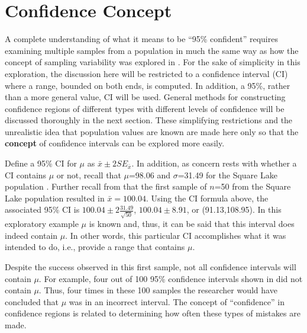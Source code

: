 \documentclass[10pt,openany]{book}\usepackage[]{graphicx}\usepackage[]{color}
\begin{document}
\section{Confidence Concept} \label{sect:CIconcept}
A complete understanding of what it means to be ``95\% confident'' requires examining multiple samples from a population in much the same way as how the concept of sampling variability was explored in .  For the sake of simplicity in this exploration, the discussion here will be restricted to a confidence interval (CI) where a range, bounded on both ends, is computed.  In addition, a 95\%, rather than a more general value, CI will be used.  General methods for constructing confidence regions of different types with different levels of confidence will be discussed thoroughly in the next section.  These simplifying restrictions and the unrealistic idea that population values are known are made here only so that the \textbf{concept} of confidence intervals can be explored more easily.

Define a 95\% CI for $\mu$ as $\bar{x}\pm2SE_{\bar{x}}$.  In addition, as concern rests with whether a CI contains $\mu$ or not, recall that $\mu$=98.06 and $\sigma$=31.49 for the Square Lake population .  Further recall from  that the first sample of $n$=50 from the Square Lake population resulted in $\bar{x}=100.04$.  Using the CI formula above, the associated 95\% CI is $100.04\pm2\frac{31.49}{\sqrt{50}}$, $100.04\pm8.91$, or (91.13,108.95).  In this exploratory example $\mu$ is known and, thus, it can be said that this interval does indeed contain $\mu$.  In other words, this particular CI accomplishes what it was intended to do, i.e., provide a range that contains $\mu$.

Despite the success observed in this first sample, not all confidence intervals will contain $\mu$.  For example, four out of 100 95\% confidence intervals shown in  did not contain $\mu$.  Thus, four times in these 100 samples the researcher would have concluded that $\mu$ was in an incorrect interval.  The concept of ``confidence'' in confidence regions is related to determining how often these types of mistakes are made.
\end{document}
